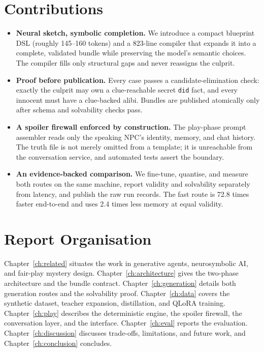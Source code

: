 ﻿\documentclass[11pt,a4paper]{report}
\begin{document}
\section{Contributions}
\begin{itemize}
  \item \textbf{Neural sketch, symbolic completion.} We introduce a compact blueprint DSL (roughly 145--160 tokens) and a 823-line compiler that expands it into a complete, validated bundle while preserving the model's semantic choices. The compiler fills only structural gaps and never reassigns the culprit.
  \item \textbf{Proof before publication.} Every case passes a candidate-elimination check: exactly the culprit may own a clue-reachable secret \texttt{did} fact, and every innocent must have a clue-backed alibi. Bundles are published atomically only after schema and solvability checks pass.
  \item \textbf{A spoiler firewall enforced by construction.} The play-phase prompt assembler reads only the speaking NPC's identity, memory, and chat history. The truth file is not merely omitted from a template; it is unreachable from the conversation service, and automated tests assert the boundary.
  \item \textbf{An evidence-backed comparison.} We fine-tune, quantise, and measure both routes on the same machine, report validity and solvability separately from latency, and publish the raw run records. The fast route is 72.8 times faster end-to-end and uses 2.4 times less memory at equal validity.
\end{itemize}

\section{Report Organisation}
Chapter~\ref{ch:related} situates the work in generative agents, neurosymbolic AI, and fair-play mystery design. Chapter~\ref{ch:architecture} gives the two-phase architecture and the bundle contract. Chapter~\ref{ch:generation} details both generation routes and the solvability proof. Chapter~\ref{ch:data} covers the synthetic dataset, teacher expansion, distillation, and QLoRA training. Chapter~\ref{ch:play} describes the deterministic engine, the spoiler firewall, the conversation layer, and the interface. Chapter~\ref{ch:eval} reports the evaluation. Chapter~\ref{ch:discussion} discusses trade-offs, limitations, and future work, and Chapter~\ref{ch:conclusion} concludes.
\end{document}
